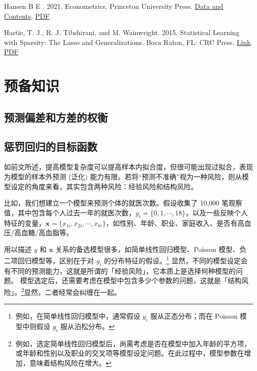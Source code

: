 {Hansen B E . 2021. Econometrics. Princeton University Press. \href{https://www.ssc.wisc.edu/~bhansen/econometrics/}{Data and Contents}, \href{https://www.ssc.wisc.edu/~bhansen/econometrics/Econometrics.pdf}{PDF}

Hastie, T. J., R. J. Tibshirani, and M. Wainwright. 2015. Statistical Learning with Sparsity: The Lasso and
Generalizations. Boca Raton, FL: CRC Press. \href{https://web.stanford.edu/~hastie/StatLearnSparsity/}{Link}. \href{https://web.stanford.edu/~hastie/StatLearnSparsity_files/SLS.pdf}{PDF} %
}
\vspace{10pt}

\section{预备知识}

\subsection{预测偏差和方差的权衡}

%


\subsection{惩罚回归的目标函数}\label{sec:Lasso-goal-function}

如前文所述，提高模型复杂度可以提高样本内拟合度，但很可能出现过拟合，表现为模型的样本外预测 (泛化) 能力有限。若将“预测不准确”视为一种风险，则从模型设定的角度来看，其实包含两种风险：经验风险和结构风险。

比如，我们想建立一个模型来预测个体的就医次数。假设收集了 10,000 笔观察值，其中包含每个人过去一年的就医次数，$y_i = \{0,1,\cdots,18\}$，以及一些反映个人特征的变量，$\mathbf{x} = \{x_{1i},x_{2i},\cdots,x_{ki}\}$，如性别、年龄、职业、家庭收入、是否有高血压/高血糖/高血脂等。

用以描述 $y$ 和 $\mathbf{x}$ 关系的备选模型很多，如简单线性回归模型、Poisson 模型、负二项回归模型等，区别在于对 $y_i$ 的分布特征的假设。\footnote{%
      例如，在简单线性回归模型中，通常假设 $y_i$ 服从正态分布；而在 Poisson 模型中则假设 $y_i$ 服从泊松分布。}
显然，不同的模型设定会有不同的预测能力，这就是所谓的「经验风险」，它本质上是选择何种模型的问题。
模型选定后，还需要考虑在模型中包含多少个参数的问题，这就是「结构风险」。\footnote{%
     例如，选定简单线性回归模型后，尚需考虑是否在模型中加入年龄的平方项，或年龄和性别以及职业的交叉项等模型设定问题。在此过程中，模型参数在增加，意味着结构风险在增大。 }显然，二者经常会纠缠在一起。


